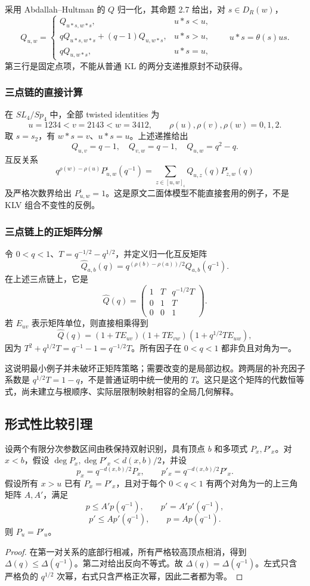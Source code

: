 采用 Abdallah--Hultman\cite{AH} 的 \(Q\) 归一化，其命题 2.7 给出，对 \(s\in D_R(w)\)，
\[
Q_{u,w}=\begin{cases}
Q_{u*s,w*s},&u*s<u,\\
qQ_{u*s,w*s}+(q-1)Q_{u,w*s},&u*s>u,\\
qQ_{u,w*s},&u*s=u,
\end{cases}
\qquad u*s=\theta(s)us.
\]
第三行是固定点项，不能从普通 KL 的两分支递推原封不动获得。

\subsubsection{三点链的直接计算}
在 \(SL_4/Sp_4\) 中，全部 twisted identities 为
\[
u=1234<v=2143<w=3412,\qquad \rho(u),\rho(v),\rho(w)=0,1,2.
\]
取 \(s=s_2\)，有 \(w*s=v\)、\(u*s=u\)。上述递推给出
\[
Q_{u,v}=q-1,\quad Q_{v,w}=q-1,\quad Q_{u,w}=q^2-q.
\]
互反关系
\[
q^{\rho(w)-\rho(u)}P^\iota_{u,w}(q^{-1})
=\sum_{z\in[u,w]_\iota}Q_{u,z}(q)P^\iota_{z,w}(q)
\]
及严格次数界给出 \(P^\iota_{u,w}=1\)。这是原文二面体模型不能直接套用的例子，不是 KLV 组合不变性的反例。

\subsubsection{三点链上的正矩阵分解}
令 \(0<q<1\)、\(T=q^{-1/2}-q^{1/2}\)，并定义归一化互反矩阵
\[
\widehat Q_{a,b}(q)=q^{(\rho(b)-\rho(a))/2}Q_{a,b}(q^{-1}).
\]
在上述三点链上，它是
\[
\widehat Q(q)=
\begin{pmatrix}
1&T&q^{-1/2}T\\
0&1&T\\
0&0&1
\end{pmatrix}.
\]
若 \(E_{uv}\) 表示矩阵单位，则直接相乘得到
\[
\widehat Q(q)
=(1+TE_{uv})(1+TE_{vw})(1+q^{1/2}TE_{uw}),
\]
因为 \(T^2+q^{1/2}T=q^{-1}-1=q^{-1/2}T\)。所有因子在 \(0<q<1\) 都非负且对角为一。

这说明最小例子并未破坏正矩阵策略；需要改变的是局部边权。跨两层的补充因子系数是 \(q^{1/2}T=1-q\)，不是普通证明中统一使用的 \(T\)。这只是这个矩阵的代数恒等式，尚未建立与根顺序、实际层限制映射相容的全局几何解释。

\subsection{形式性比较引理}\label{klv:comparison-lemmas}
\begin{proposition}[互反比较]\label{prop:reciprocal-comparison}
设两个有限分次参数区间由秩保持双射识别，具有顶点 \(b\) 和多项式 \(P_x,P'_x\)。对 \(x<b\)，假设 \(\deg P_x,\deg P'_x<d(x,b)/2\)，并设
\[
p_x=q^{-d(x,b)/2}P_x,\qquad p'_x=q^{-d(x,b)/2}P'_x.
\]
假设所有 \(x>u\) 已有 \(P_x=P'_x\)，且对于每个 \(0<q<1\) 有两个对角为一的上三角矩阵 \(A,A'\)，满足
\[
p\le A'p(q^{-1}),\qquad p'=A'p'(q^{-1}),
\]
\[
p'\le Ap'(q^{-1}),\qquad p=Ap(q^{-1}).
\]
则 \(P_u=P'_u\)。
\end{proposition}
\begin{proof}
在第一对关系的底部行相减，所有严格较高顶点相消，得到 \(\Delta(q)\le\Delta(q^{-1})\)。第二对给出反向不等式。故 \(\Delta(q)=\Delta(q^{-1})\)。左式只含严格负的 \(q^{1/2}\) 次幂，右式只含严格正次幂，因此二者都为零。
\end{proof}

